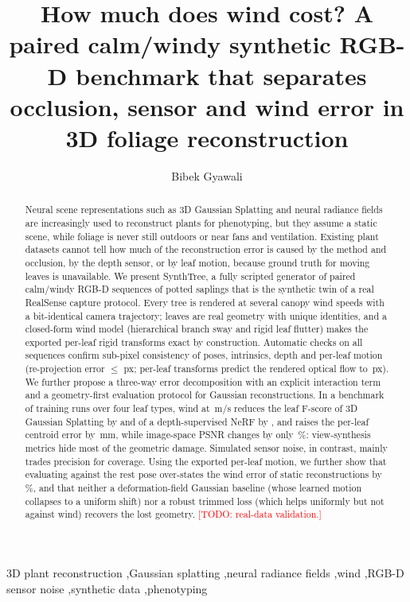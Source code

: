 \documentclass[preprint,11pt,authoryear]{elsarticle}
\newcommand{\todo}[1]{\textcolor{red}{[TODO: #1]}}
\begin{document}
\begin{frontmatter}

\title{How much does wind cost? A paired calm/windy synthetic RGB-D benchmark that separates occlusion, sensor and wind error in 3D foliage reconstruction}

\author[1]{Bibek Gyawali}

\begin{abstract}
Neural scene representations such as 3D Gaussian Splatting and neural radiance fields are increasingly used to reconstruct plants for phenotyping, but they assume a static scene, while foliage is never still outdoors or near fans and ventilation. Existing plant datasets cannot tell how much of the reconstruction error is caused by the method and occlusion, by the depth sensor, or by leaf motion, because ground truth for moving leaves is unavailable. We present SynthTree, a fully scripted generator of paired calm/windy RGB-D sequences of potted saplings that is the synthetic twin of a real RealSense capture protocol. Every tree is rendered at several canopy wind speeds with a bit-identical camera trajectory; leaves are real geometry with unique identities, and a closed-form wind model (hierarchical branch sway and rigid leaf flutter) makes the exported per-leaf rigid transforms exact by construction. Automatic checks on all \NSeqValidated{} sequences confirm sub-pixel consistency of poses, intrinsics, depth and per-leaf motion (re-projection error $\le$\,\ValSelfReprojPx\,px; per-leaf transforms predict the rendered optical flow to \ValLeafFlowPx\,px). We further propose a three-way error decomposition with an explicit interaction term and a geometry-first evaluation protocol for Gaussian reconstructions. In a benchmark of \NResultRuns{} training runs over four leaf types, wind at \WindMax\,m/s reduces the leaf F-score of 3D Gaussian Splatting by \SpWindHiF{} and of a depth-supervised NeRF by \NfWindHiF{}, and raises the per-leaf centroid error by \SpWindHiCentroid\,mm, while image-space PSNR changes by only \RelChangePSNR\,\%: view-synthesis metrics hide most of the geometric damage. Simulated sensor noise, in contrast, mainly trades precision for coverage. Using the exported per-leaf motion, we further show that evaluating against the rest pose over-states the wind error of static reconstructions by \StWindDropOverPct\,\%, and that neither a deformation-field Gaussian baseline (whose learned motion collapses to a uniform shift) nor a robust trimmed loss (which helps uniformly but not against wind) recovers the lost geometry. \todo{real-data validation.}
\end{abstract}

\begin{keyword}
3D plant reconstruction \sep Gaussian splatting \sep neural radiance fields \sep wind \sep RGB-D sensor noise \sep synthetic data \sep phenotyping
\end{keyword}
\end{frontmatter}
\end{document}
